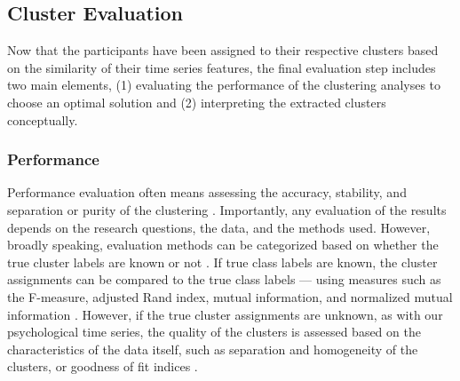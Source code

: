 \documentclass[man, 12pt, a4paper, floatsintext]{apa7}
\theoremstyle{break}
\theoremstyle{plain}
\begin{document}
\subsection{Cluster Evaluation}
Now that the participants have been assigned to their respective clusters based on the similarity of their time series features, the final evaluation step includes two main elements, (1) evaluating the performance of the clustering analyses to choose an optimal solution and (2) interpreting the extracted clusters conceptually. 

\subsubsection{Performance}
Performance evaluation often means assessing the accuracy, stability, and separation or purity of the clustering \citep{keogh2003}. Importantly, any evaluation of the results depends on the research questions, the data, and the methods used. However, broadly speaking, evaluation methods can be categorized based on whether the true cluster labels are known or not \citep{saxena2017}. If true class labels are known, the cluster assignments can be compared to the true class labels --- using measures such as the F-measure, adjusted Rand index, mutual information, and normalized mutual information \citep[i.e., external evaluation; e.g.,][]{liao2005}. However, if the true cluster assignments are unknown, as with our psychological time series, the quality of the clusters is assessed based on the characteristics of the data itself, such as separation and homogeneity of the clusters, or goodness of fit indices \citep[i.e., internal evaluation; e.g.,][]{Aghabozorgi2015}. 
\end{document}
